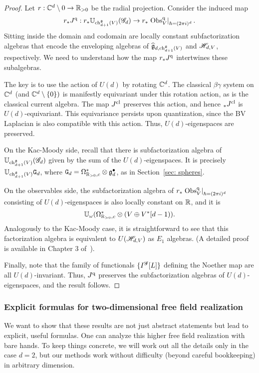 \begin{proof}
Let $r : \mathbb C^d \setminus 0 \to \mathbb R_{>0}$ be the radial projection. 
Consider the induced map
\[
r_* J^{\rm q} :  r_* \mathbb U_{{\rm ch}_{d+1}^\mathfrak g(V)} (\mathscr G_d) \to  r_* \left. {\rm Obs}^{\rm q}_V \right|_{\hbar = (2\pi i)^d}  .
\]
Sitting inside the domain and codomain are locally constant subfactorization algebras that encode the enveloping algebras of $\widehat{\mathfrak g}_{d,{\rm ch}^\mathfrak g_{d+1}(V)}$ and $\mathscr H_{d,V}$, respectively.
We need to understand how the map $r_* J^{\rm q}$ intertwines these subalgebras.

The key is to use the action of $U(d)$ by rotating $\mathbb C^d$.
The classical $\beta\gamma$ system on $\mathbb C^d$ (and $\mathbb C^d \setminus \{0\})$ is manifestly equivariant under this rotation action, as is the classical current algebra.
The map $J^{\rm cl}$ preserves this action, and hence $_* J^{\rm cl}$ is $U(d)$-equivariant.
This equivariance persists upon quantization, since the BV Laplacian is also compatible with this action. 
Thus, $U(d)$-eigenspaces are preserved.

On the Kac-Moody side, recall that there is subfactorization algebra of $\mathbb U_{{\rm ch}_{d+1}^\mathfrak g(V)} (\mathscr G_d)$ given by the sum of the $U(d)$-eigenspaces. 
It is precisely $\mathbb U_{{\rm ch}_{d+1}^\mathfrak g(V)} \mathtt{G}_d$, where $\mathtt{G}_d = \Omega^*_{\mathbb R_{>0},c} \otimes \mathfrak g^\bullet_d$, as in Section~\ref{sec: spheres}.

On the observables side, the subfactorization algebra of $r_* \left. {\rm Obs}^{\rm q}_V \right|_{\hbar = (2\pi i)^d}$ consisting of $U(d)$-eigenspaces is also locally constant on $\mathbb R$,
and it is 
\[
\mathbb U_\omega (\Omega^*_{\mathbb R_{>0},c} \otimes (V \oplus V^*[d-1)).
\]
Analogously to the Kac-Moody case, it is straightforward to see that this factorization algebra is equivalent to $U(\mathscr H_{d,V})$ as $E_1$ algebras.
(A detailed proof is available in Chapter 3 of~\cite{BWthesis}).

Finally, note that the family of functionals $\{I^{\mathscr G}[L]\}$ defining the Noether map are all $U(d)$-invariant.
Thus, $J^{\rm q}$ preserves the subfactorization algebras of $U(d)$-eigenspaces, and the result follows.
\end{proof}

\subsubsection{Explicit formulas for two-dimensional free field realization}

We want to show that these results are not just abstract statements but lead to explicit, useful formulas.
One can analyze this higher free field realization with bare hands.
To keep things concrete, we will work out all the details only in the case $d=2$, but our methods work without difficulty (beyond careful bookkeeping) in arbitrary dimension.

